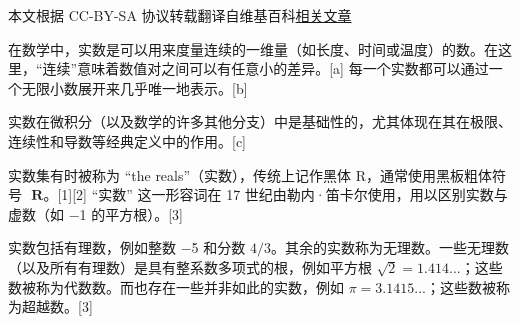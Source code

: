 
本文根据 CC-BY-SA 协议转载翻译自维基百科\href{https://en.wikipedia.org/wiki/Real_number}{相关文章}

在数学中，实数是可以用来度量连续的一维量（如长度、时间或温度）的数。在这里，“连续”意味着数值对之间可以有任意小的差异。[a] 每一个实数都可以通过一个无限小数展开来几乎唯一地表示。[b]

实数在微积分（以及数学的许多其他分支）中是基础性的，尤其体现在其在极限、连续性和导数等经典定义中的作用。[c]

实数集有时被称为 “the reals”（实数），传统上记作黑体 R，通常使用黑板粗体符号 ⁠
$\mathbf{R}$⁠。[1][2] “实数” 这一形容词在 17 世纪由勒内·笛卡尔使用，用以区别实数与虚数（如 −1 的平方根）。[3]

实数包括有理数，例如整数 −5 和分数 $4/3$。其余的实数称为无理数。一些无理数（以及所有有理数）是具有整系数多项式的根，例如平方根 $\sqrt{2} = 1.414...$；这些数被称为代数数。而也存在一些并非如此的实数，例如 $\pi = 3.1415...$；这些数被称为超越数。[3]
